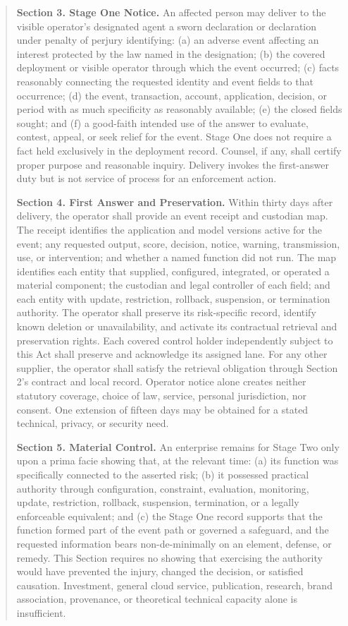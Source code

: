 \begin{quote}
\textbf{Section 3. Stage One Notice.} An affected person may deliver to the visible operator's designated agent a sworn declaration or declaration under penalty of perjury identifying: (a) an adverse event affecting an interest protected by the law named in the designation; (b) the covered deployment or visible operator through which the event occurred; (c) facts reasonably connecting the requested identity and event fields to that occurrence; (d) the event, transaction, account, application, decision, or period with as much specificity as reasonably available; (e) the closed fields sought; and (f) a good-faith intended use of the answer to evaluate, contest, appeal, or seek relief for the event. Stage One does not require a fact held exclusively in the deployment record. Counsel, if any, shall certify proper purpose and reasonable inquiry. Delivery invokes the first-answer duty but is not service of process for an enforcement action.

\textbf{Section 4. First Answer and Preservation.} Within thirty days after delivery, the operator shall provide an event receipt and custodian map. The receipt identifies the application and model versions active for the event; any requested output, score, decision, notice, warning, transmission, use, or intervention; and whether a named function did not run. The map identifies each entity that supplied, configured, integrated, or operated a material component; the custodian and legal controller of each field; and each entity with update, restriction, rollback, suspension, or termination authority. The operator shall preserve its risk-specific record, identify known deletion or unavailability, and activate its contractual retrieval and preservation rights. Each covered control holder independently subject to this Act shall preserve and acknowledge its assigned lane. For any other supplier, the operator shall satisfy the retrieval obligation through Section 2's contract and local record. Operator notice alone creates neither statutory coverage, choice of law, service, personal jurisdiction, nor consent. One extension of fifteen days may be obtained for a stated technical, privacy, or security need.

\textbf{Section 5. Material Control.} An enterprise remains for Stage Two only upon a prima facie showing that, at the relevant time: (a) its function was specifically connected to the asserted risk; (b) it possessed practical authority through configuration, constraint, evaluation, monitoring, update, restriction, rollback, suspension, termination, or a legally enforceable equivalent; and (c) the Stage One record supports that the function formed part of the event path or governed a safeguard, and the requested information bears non-de-minimally on an element, defense, or remedy. This Section requires no showing that exercising the authority would have prevented the injury, changed the decision, or satisfied causation. Investment, general cloud service, publication, research, brand association, provenance, or theoretical technical capacity alone is insufficient.


\end{quote}
